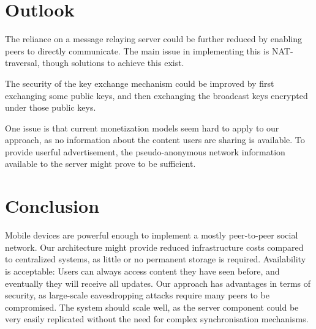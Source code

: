 \documentclass{report}
\begin{document}
\section{Outlook}

The reliance on a message relaying server could be further reduced by enabling peers to directly communicate. The main issue in implementing this is NAT-traversal, though solutions to achieve this exist.

The security of the key exchange mechanism could be improved by first exchanging some public keys, and then exchanging the broadcast keys encrypted under those public keys.

One issue is that current monetization models seem hard to apply to our approach, as no information about the content users are sharing is available. To provide userful advertisement, the pseudo-anonymous network information available to the server might prove to be sufficient. 

\section{Conclusion}

Mobile devices are powerful enough to implement a mostly peer-to-peer social network. Our architecture might provide reduced infrastructure costs compared to centralized systems, as little or no permanent storage is required. Availability is acceptable: Users can always access content they have seen before, and eventually they will receive all updates. Our approach has advantages in terms of security, as large-scale eavesdropping attacks require many peers to be compromised.
The system should scale well, as the server component could be very easily replicated without the need for complex synchronisation mechanisms.





\end{document}
